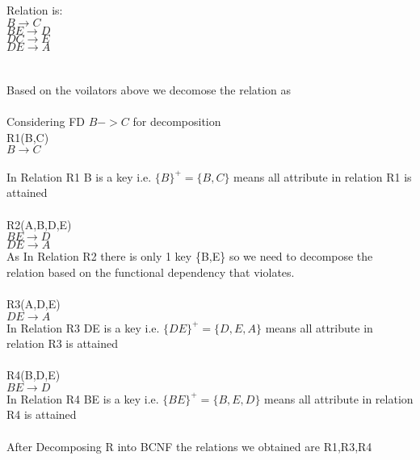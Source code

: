 Relation is:\\
$B \rightarrow C$\\
$BE \rightarrow D$\\
$DC \rightarrow E$\\
$DE \rightarrow A$\\ \\ \\

Based on the voilators above we decomose the relation as \\ \\

Considering FD $B->C$ for decomposition \\
R1(B,C)\\
$B  \rightarrow C$\\ \\

In Relation R1 B is a key i.e. $\{B\}^+ = \{ B,C\}$ means all attribute in relation R1 is attained\\ \\
R2(A,B,D,E)\\
$BE \rightarrow D$\\
$DE \rightarrow A$\\

As In Relation R2 there is only 1 key \{B,E\} so we need to decompose the relation based on the functional dependency that violates.\\ \\

R3(A,D,E)\\
$DE \rightarrow A$\\


In Relation R3 DE is a key i.e. $\{DE\}^+ = \{ D,E,A\}$ means all attribute in relation R3 is attained\\ \\

R4(B,D,E)\\
$BE \rightarrow D$\\

In Relation R4 BE is a key i.e. $\{BE\}^+ = \{ B,E,D\}$ means all attribute in relation R4 is attained\\ \\


After Decomposing R into BCNF the relations we obtained are R1,R3,R4 \\

